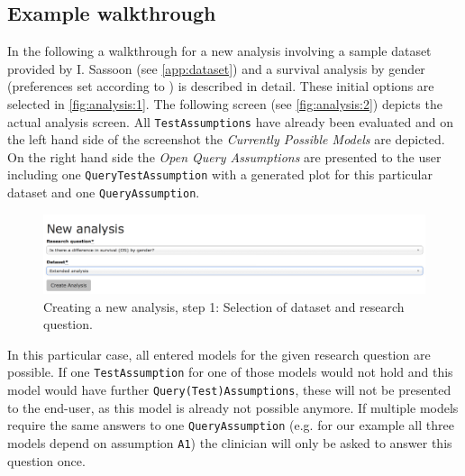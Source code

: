 \subsection{Example walkthrough}
\label{sub:walk}

In the following a walkthrough for a new analysis involving a sample dataset provided by I. Sassoon (see \autoref{app:dataset}) and a survival analysis by gender (preferences set according to \cite{sassoon2016CD}) is described in detail. These initial options are selected in \autoref{fig:analysis:1}. The following screen (see \autoref{fig:analysis:2}) depicts the actual analysis screen. All \texttt{TestAssumptions} have already been evaluated and on the left hand side of the screenshot the \textit{Currently Possible Models} are depicted. On the right hand side the \textit{Open Query Assumptions} are presented to the user including one \texttt{QueryTestAssumption} with a generated plot for this particular dataset and one \texttt{QueryAssumption}. 

\begin{figure}[b]
	\centering
	\includegraphics[width=\textwidth]{figures/ui_analysis_0}
	\caption{Creating a new analysis, step 1: Selection of dataset and research question. }
	\label{fig:analysis:1}
\end{figure}

In this particular case, all entered models for the given research question are possible. If one \texttt{TestAssumption} for one of those models would not hold and this model would have further \texttt{Query(Test)Assumptions}, these will not be presented to the end-user, as this model is already not possible anymore. If multiple models require the same answers to one \texttt{QueryAssumption} (e.g. for our example all three models depend on assumption \texttt{A1}) the clinician will only be asked to answer this question once. 

